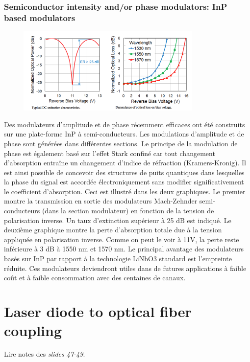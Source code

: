\newpage
\subsubsection{Semiconductor intensity and/or phase modulators: InP based modulators}
\begin{figure}
	\vspace{-5mm}
	\includegraphics[scale=0.9]{ch4/image32}
	\end{figure}
Des modulateurs d'amplitude et de phase récemment efficaces ont été construits sur une plate-forme InP à semi-conducteurs. Les modulations d'amplitude et de phase sont générées dans différentes sections. Le principe de la modulation de phase est également basé sur l'effet Stark confiné car tout changement d'absorption entraîne un changement d'indice de réfraction (Kramers-Kronig). Il est ainsi possible de concevoir des structures de puits quantiques dans lesquelles la phase du signal est accordée électroniquement sans modifier significativement le coefficient d'absorption. Ceci est illustré dans les deux graphiques. Le premier montre la transmission en sortie des modulateurs Mach-Zehnder semi-conducteurs (dans la section modulateur) en fonction de la tension de polarisation inverse. Un taux d'extinction supérieur à 25 dB est indiqué. Le deuxième graphique montre la perte d'absorption totale due à la tension appliquée en polarisation inverse. Comme on peut le voir à 11V, la perte reste inférieure à 3 dB à 1550 nm et 1570 nm. Le principal avantage des modulateurs basés sur InP par rapport à la technologie LiNbO3 standard est l'empreinte réduite. Ces modulateurs deviendront utiles dans de futures applications à faible coût et à faible consommation avec des centaines de canaux.

\section{Laser diode to optical fiber coupling}
Lire notes des \textit{slides 47-49}.
















